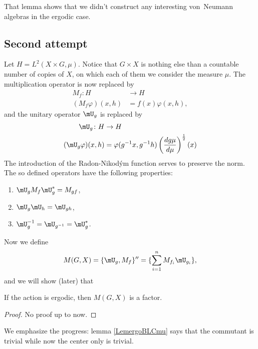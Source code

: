 That lemma shows that we didn't construct any interesting von~Neumann algebras in the ergodic case.

					\subsection{Second attempt}

Let $H= L^2(X\times G,\mu)$. Notice that $G\times X$ is nothing else than a countable number of copies of $X$, on which each of them we consider the measure $\mu$. The multiplication operator is now replaced by
\begin{equation}
\begin{aligned}
 M_f\colon H&\to H \\ 
   (M_f\varphi)(x,h)&=f(x)\varphi(x,h),
\end{aligned}
\end{equation}
and the unitary operator $\mU_g$ is replaced by
\begin{equation}
\begin{aligned}
 \mU_g\colon H&\to H \\ 
   (\mU_g\varphi)(x,h)&=\varphi(g^{-1}x,g^{-1} h)\left( \frac{ d g\mu }{ d \mu } \right)^{\frac{ 1 }{2}}(x)
\end{aligned}
\end{equation}
The introduction of the Radon-Nikod\'ym function serves to preserve the norm. The so defined operators have the following properties:
\begin{enumerate}
\item $\mU_g M_f\mU_g^*=M_{gf}$,
\item $\mU_g\mU_h=\mU_{gh}$,
\item $\mU_g^{-1}=\mU_{g^{-1}}=\mU_g^*$.
\end{enumerate}
Now we define
\begin{equation}
   M(G,X)=\{ \mU_g,M_f \}''=\{ \sum_{i=1}^nM_{f_i}\mU_{g_i} \},
\end{equation}
 and we will show (later) that
\begin{theorem}
If the action is ergodic, then $M(G,X)$ is a factor.
\end{theorem}
\begin{proof}
No proof up to now.
\end{proof}
We emphasize the progress: lemma \ref{LemergoBLCmu} says that the commutant is trivial while now the center only is trivial.

